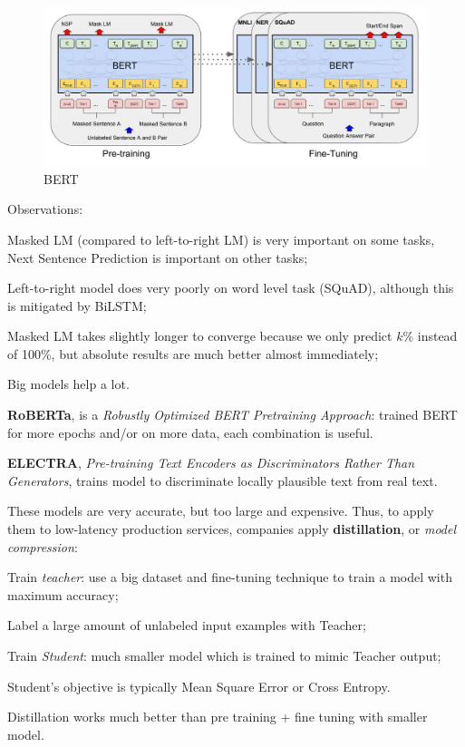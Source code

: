 \begin{figure}[h!]
    \centering
    \includegraphics[width=0.7\linewidth]{images/seq-bert}
    \caption[BERT]{BERT}
    \label{fig:seq-bert}
\end{figure}

Observations:
\begin{myitem}
    \item Masked LM (compared to left-to-right LM) is very important on some tasks, Next Sentence Prediction is important on other tasks;
    \item Left-to-right model does very poorly on word level task (SQuAD), although this is mitigated by BiLSTM;
    \item Masked LM takes slightly longer to converge because we only predict $k$\% instead of 100\%, but absolute results are much better almost immediately;
    \item Big models help a lot.
\end{myitem}

\textbf{RoBERTa}, is a \textit{Robustly Optimized BERT Pretraining Approach}: trained BERT for more epochs and/or on more data, each combination is useful.

\textbf{ELECTRA}, \textit{Pre-training Text Encoders as Discriminators Rather Than Generators}, trains model to discriminate locally plausible text from real text.

These models are very accurate, but too large and expensive. Thus, to apply them to low-latency production services, companies apply \textbf{distillation}, or \textit{model compression}:
\begin{myitem}
    \item Train \textit{teacher}: use a big dataset and fine-tuning technique to train a model with maximum accuracy;
    \item Label a large amount of unlabeled input examples with Teacher;
    \item Train \textit{Student}: much smaller model which is trained to mimic Teacher output;
    \item Student's objective is typically Mean Square Error or Cross Entropy.
\end{myitem}
Distillation works much better than pre training + fine tuning with smaller model.
